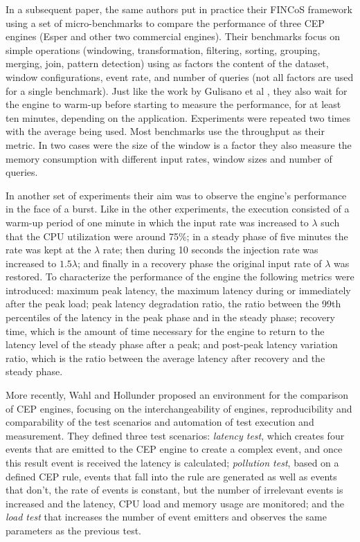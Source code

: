 \documentclass[ppgc,diss,english]{iiufrgs}
\begin{document}
In a subsequent paper, the same authors put in practice their FINCoS framework \cite{mendes2009performance} using a set of micro-benchmarks to compare the performance of three CEP engines (Esper and other two commercial engines). Their benchmarks focus on simple operations (windowing, transformation, filtering, sorting, grouping, merging, join, pattern detection) using as factors the content of the dataset, window configurations, event rate, and number of queries (not all factors are used for a single benchmark). Just like the work by Gulisano et al \cite{gulisano2012streamcloud}, they also wait for the engine to warm-up before starting to measure the performance, for at least ten minutes, depending on the application. Experiments were repeated two times with the average being used. Most benchmarks use the throughput as their metric. In two cases were the size of the window is a factor they also measure the memory consumption with different input rates, window sizes and number of queries.

In another set of experiments their aim was to observe the engine's performance in the face of a burst. Like in the other experiments, the execution consisted of a warm-up period of one minute in which the input rate was increased to $\lambda$ such that the CPU utilization were around 75\%; in a steady phase of five minutes the rate was kept at the $\lambda$ rate; then during 10 seconds the injection rate was increased to $1.5\lambda$; and finally in a recovery phase the original input rate of $\lambda$ was restored. To characterize the performance of the engine the following metrics were introduced: maximum peak latency, the maximum latency during or immediately after the peak load; peak latency degradation ratio, the ratio between the 99th percentiles of the latency in the peak phase and in the steady phase; recovery time, which is the amount of time necessary for the engine to return to the latency level of the steady phase after a peak; and post-peak latency variation ratio, which is the ratio between the average latency after recovery and the steady phase.


More recently, Wahl and Hollunder \cite{wahl2012performance} proposed an environment for the comparison of CEP engines, focusing on the interchangeability of engines, reproducibility and comparability of the test scenarios and automation of test execution and measurement. They defined three test scenarios: \emph{latency test}, which creates four events that are emitted to the CEP engine to create a complex event, and once this result event is received the latency is calculated; \emph{pollution test}, based on a defined CEP rule, events that fall into the rule are generated as well as events that don't, the rate of events is constant, but the number of irrelevant events is increased and the latency, CPU load and memory usage are monitored; and the \emph{load test} that increases the number of event emitters and observes the same parameters as the previous test.
\end{document}
